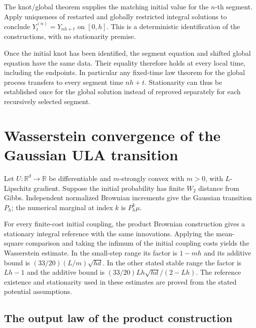 \documentclass[11pt,a4paper]{report}
\begin{document}
The knot/\allowbreak{}global theorem supplies the matching initial value for the \(n\)-th segment. Apply uniqueness of restarted and globally restricted integral solutions to conclude \(Y^{(n)}_t=Y_{nh+t}\) on \([0,h]\). This is a deterministic identification of the constructions, with no stationarity premise.



Once the initial knot has been identified, the segment equation and shifted global equation have the same data. Their equality therefore holds at every local time, including the endpoints. In particular any fixed-time law theorem for the global process transfers to every segment time \(nh+t\). Stationarity can thus be established once for the global solution instead of reproved separately for each recursively selected segment.

\section{\texorpdfstring{Wasserstein convergence of the Gaussian ULA transition}{Wasserstein convergence of the Gaussian ULA transition}}
\label{proof-module-UnadjustedLangevin-CanonicalULA-lean}


Let \(U:\mathbb R^d\to\mathbb R\) be differentiable and \(m\)-strongly convex with \(m>0\), with \(L\)-Lipschitz gradient. Suppose the initial probability has finite \(W_2\) distance from Gibbs. Independent normalized Brownian increments give the Gaussian transition \(P_h\); the numerical marginal at index \(k\) is \(P_h^k\mu\).



For every finite-cost initial coupling, the product Brownian construction gives a stationary integral reference with the same innovations. Applying the mean-square comparison and taking the infimum of the initial coupling costs yields the Wasserstein estimate. In the small-step range its factor is \(1-mh\) and its additive bound is \((33/20)(L/m)\sqrt{hd}\). In the other stated stable range the factor is \(Lh-1\) and the additive bound is \((33/20)Lh\sqrt{hd}/(2-Lh)\). The reference existence and stationarity used in these estimates are proved from the stated potential assumptions.

\subsection{\texorpdfstring{The output law of the product construction}{The output law of the product construction}}
\label{report-step-UnadjustedLangevin-CanonicalULA-lean-1}
\end{document}
